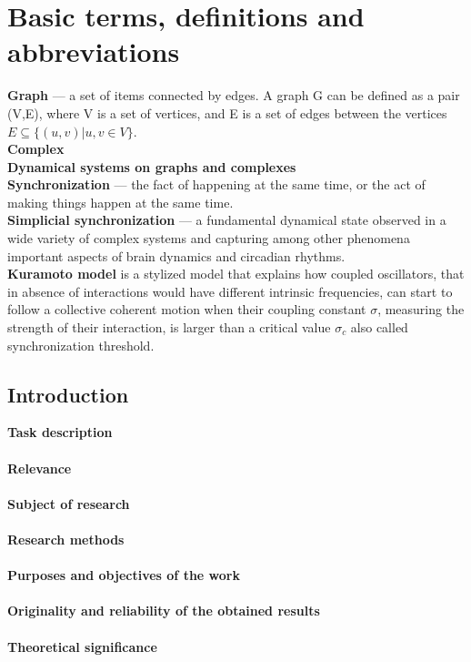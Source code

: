 \documentclass[draft]{article}
\begin{document}
\section {Basic terms, definitions and abbreviations}
\textbf{Graph} — a set of items connected by edges. A graph G can be defined as a pair (V,E), where V is a set of vertices, and E is a set of edges between the vertices  $E \subseteq \{(u,v) | u, v \in V\}$\cite{litlink1}.\\
\textbf{Complex}\\
\textbf{Dynamical systems on graphs and complexes}\\
\textbf{Synchronization} — the fact of happening at the same time, or the act of making things happen at the same time\cite{litlink2}.\\
\textbf{Simplicial synchronization} — a fundamental dynamical state observed in a wide variety of complex systems and capturing among other phenomena important aspects of brain dynamics and circadian rhythms\cite{litlink3}.\\
\textbf{Kuramoto model} is a stylized model that explains how coupled oscillators, that in absence of interactions would have different intrinsic frequencies, can start to follow a collective coherent motion when their coupling constant $\sigma$, measuring the strength of their interaction, is larger than a critical value $\sigma_c$ also called synchronization threshold\cite{litlink3}.\\
\newpage
\begin{center}
\item\section {Introduction}
\end{center}
\textbf{Task description}\\
~\\
\textbf{Relevance}\\
~\\
\textbf{Subject of research}\\
~\\
\textbf{Research methods}\\
~\\
\textbf{Purposes and objectives of the work}\\
~\\
\textbf{Originality and reliability of the obtained results}\\
~\\
\textbf{Theoretical significance}\\
\end{document}
